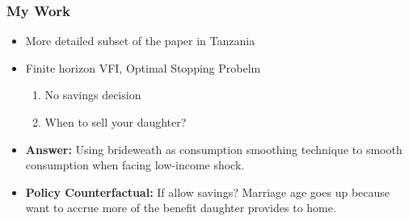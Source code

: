 \documentclass{beamer}
\begin{document}
\begin{frame}
\frametitle{My Work}

\begin{itemize}
\item More detailed subset of the paper in Tanzania
\item Finite horizon VFI, Optimal Stopping Probelm
\begin{enumerate}
  \item No savings decision
  \item When to sell your daughter?
\end{enumerate}
\item \textbf{Answer:} Using brideweath as consumption smoothing technique to smooth consumption when facing low-income shock.
\item \textbf{Policy Counterfactual:} If allow savings? Marriage age goes up because want to accrue more of the benefit daughter provides to home.
\end{itemize}

\end{frame}

\end{document}
